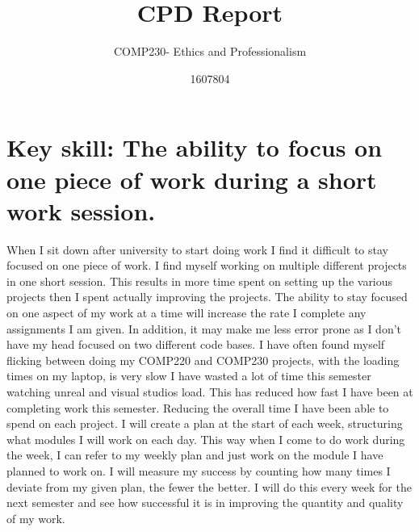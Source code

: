 \documentclass{scrartcl}
\title{CPD Report}
\subtitle{COMP230- Ethics and Professionalism}
\author{1607804}
\begin{document}
\maketitle


\section{Key skill: The ability to focus on one piece of work during a short work session.}
When I sit down after university to start doing work I find it difficult to stay focused on one piece of work. I find myself working on multiple different projects in one short session. This results in more time spent on setting up the various projects then I spent actually improving the projects. The ability to stay focused on one aspect of my work at a time will increase the rate I complete any assignments I am given. In addition, it may make me less error prone as I don't have my head focused on two different code bases. I have often found myself flicking between doing my COMP220 and COMP230 projects, with the loading times on my laptop, is very slow I have wasted a lot of time this semester watching unreal and visual studios load. This has reduced how fast I have been at completing work this semester. Reducing the overall time I have been able to spend on each project. I will create a plan at the start of each week, structuring what modules I will work on each day. This way when I come to do work during the week, I can refer to my weekly plan and just work on the module I have planned to work on. I will measure my success by counting how many times I deviate from my given plan, the fewer the better. I will do this every week for the next semester and see how successful it is in improving the quantity and quality of my work. 
\end{document}
